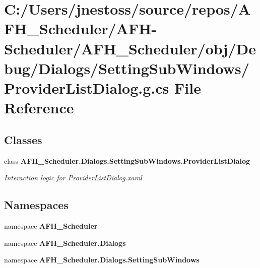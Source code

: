 \section{C\+:/\+Users/jnestoss/source/repos/\+A\+F\+H\+\_\+\+Scheduler/\+A\+F\+H-\/\+Scheduler/\+A\+F\+H\+\_\+\+Scheduler/obj/\+Debug/\+Dialogs/\+Setting\+Sub\+Windows/\+Provider\+List\+Dialog.g.\+cs File Reference}
\label{_debug_2_dialogs_2_setting_sub_windows_2_provider_list_dialog_8g_8cs}
\subsection*{Classes}
\begin{DoxyCompactItemize}
\item 
class \textbf{ A\+F\+H\+\_\+\+Scheduler.\+Dialogs.\+Setting\+Sub\+Windows.\+Provider\+List\+Dialog}
\begin{DoxyCompactList}\small\item\em Interaction logic for Provider\+List\+Dialog.\+xaml \end{DoxyCompactList}\end{DoxyCompactItemize}
\subsection*{Namespaces}
\begin{DoxyCompactItemize}
\item 
namespace \textbf{ A\+F\+H\+\_\+\+Scheduler}
\item 
namespace \textbf{ A\+F\+H\+\_\+\+Scheduler.\+Dialogs}
\item 
namespace \textbf{ A\+F\+H\+\_\+\+Scheduler.\+Dialogs.\+Setting\+Sub\+Windows}
\end{DoxyCompactItemize}
